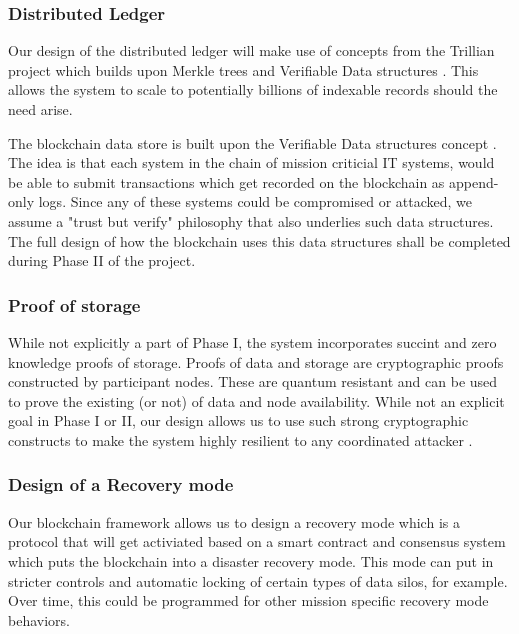 \subsubsection{Distributed Ledger}

Our design of the distributed ledger will make use of concepts from the Trillian project which builds upon Merkle trees
and Verifiable Data structures \cite{verifiable2015}. This allows the system to scale to potentially billions of
indexable records should the need arise.

The blockchain data store is built upon the Verifiable Data structures concept \cite{verfiable2015}. The idea is that each
system in the chain of mission criticial IT systems, would be able to submit transactions which get recorded on the
blockchain as append-only logs. Since any of these systems could be compromised or attacked, we assume a "trust but
verify" philosophy that also underlies such data structures. The full design of how the blockchain uses this data
structures shall be completed during Phase II of the project.

\subsubsection{Proof of storage}

While not explicitly a part of Phase I, the system incorporates succint and zero knowledge proofs of storage. Proofs
of data and storage are cryptographic proofs constructed by participant nodes. These are quantum resistant and can be
used to prove the existing (or not) of data and node availability. While not an explicit goal in Phase I or II, our
design allows us to use such strong cryptographic constructs to make the system highly resilient to any coordinated
attacker \cite{ben2019}.

\subsubsection{Design of a Recovery mode}

Our blockchain framework allows us to design a recovery mode which is a protocol that will get activiated based on a 
smart contract and consensus system which puts the blockchain into a disaster recovery mode. This mode can put in 
stricter controls and automatic locking of certain types of data silos, for example. Over time, this could be programmed
for other mission specific recovery mode behaviors.
